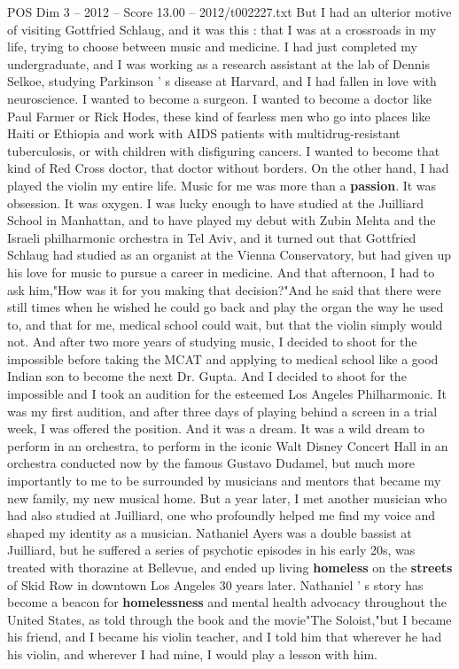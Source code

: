\begin{textsample}{POS Dim 3 – 2012 – Score 13.00 – 2012/t002227.txt}
But I had an ulterior motive of visiting Gottfried Schlaug, and it was this : that I was at a crossroads in my life, trying to choose between music and medicine.
I had just completed my undergraduate, and I was working as a research assistant at the lab of Dennis Selkoe, studying Parkinson ' s disease at Harvard, and I had fallen in love with neuroscience.
I wanted to become a surgeon.
I wanted to become a doctor like Paul Farmer or Rick Hodes, these kind of fearless men who go into places like Haiti or Ethiopia and work with AIDS patients with multidrug-resistant tuberculosis, or with children with disfiguring cancers.
I wanted to become that kind of Red Cross doctor, that doctor without borders.
On the other hand, I had played the violin my entire life.
Music for me was more than a \textbf{passion}.
It was obsession.
It was oxygen.
I was lucky enough to have studied at the Juilliard School in Manhattan, and to have played my debut with Zubin Mehta and the Israeli philharmonic orchestra in Tel Aviv, and it turned out that Gottfried Schlaug had studied as an organist at the Vienna Conservatory, but had given up his love for music to pursue a career in medicine.
And that afternoon, I had to ask him,"How was it for you making that decision?"And he said that there were still times when he wished he could go back and play the organ the way he used to, and that for me, medical school could wait, but that the violin simply would not.
And after two more years of studying music, I decided to shoot for the impossible before taking the MCAT and applying to medical school like a good Indian son to become the next Dr.
Gupta.
And I decided to shoot for the impossible and I took an audition for the esteemed Los Angeles Philharmonic.
It was my first audition, and after three days of playing behind a screen in a trial week, I was offered the position.
And it was a dream.
It was a wild dream to perform in an orchestra, to perform in the iconic Walt Disney Concert Hall in an orchestra conducted now by the famous Gustavo Dudamel, but much more importantly to me to be surrounded by musicians and mentors that became my new family, my new musical home.
But a year later, I met another musician who had also studied at Juilliard, one who profoundly helped me find my voice and shaped my identity as a musician.
Nathaniel Ayers was a double bassist at Juilliard, but he suffered a series of psychotic episodes in his early 20s, was treated with thorazine at Bellevue, and ended up living \textbf{homeless} on the \textbf{streets} of Skid Row in downtown Los Angeles 30 years later.
Nathaniel ' s story has become a beacon for \textbf{homelessness} and mental health advocacy throughout the United States, as told through the book and the movie"The Soloist,"but I became his friend, and I became his violin teacher, and I told him that wherever he had his violin, and wherever I had mine, I would play a lesson with him.

\end{textsample}
